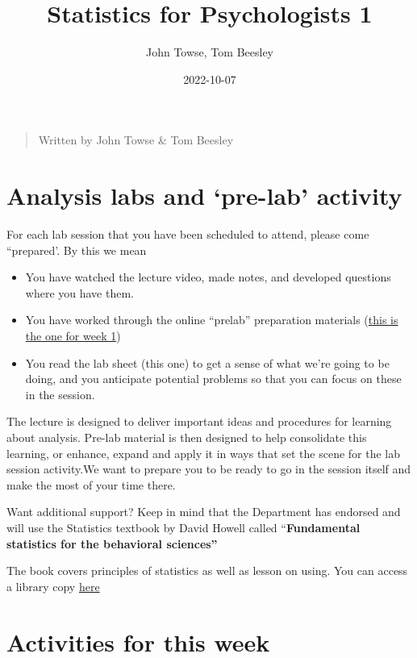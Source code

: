 \documentclass[
]{book}
\title{Statistics for Psychologists 1}
\author{John Towse, Tom Beesley}
\date{2022-10-07}
\begin{document}
\maketitle

{
\setcounter{tocdepth}{1}
\tableofcontents
}
\begin{quote}
Written by John Towse \& Tom Beesley
\end{quote}

\hypertarget{analysis-labs-and-pre-lab-activity}{%
\section{Analysis labs and `pre-lab' activity}\label{analysis-labs-and-pre-lab-activity}}

For each lab session that you have been scheduled to attend, please come ``prepared'. By this we mean

\begin{itemize}
\item
  You have watched the lecture video, made notes, and developed questions where you have them.
\item
  You have worked through the online ``prelab'' preparation materials (\href{https://ma-rconnect.lancs.ac.uk/Week_1_prep}{this is the one for week 1})
\item
  You read the lab sheet (this one) to get a sense of what we're going to be doing, and you anticipate potential problems so that you can focus on these in the session.
\end{itemize}

The lecture is designed to deliver important ideas and procedures for learning about analysis. Pre-lab material is then designed to help consolidate this learning, or enhance, expand and apply it in ways that set the scene for the lab session activity.We want to prepare you to be ready to go in the session itself and make the most of your time there.

Want additional support? Keep in mind that the Department has endorsed and will use the Statistics textbook by David Howell called ``\textbf{Fundamental statistics for the behavioral sciences''}

The book covers principles of statistics as well as lesson on using. You can access a library copy \href{https://onesearch.lancaster-university.uk/permalink/f/cssk39/44LAN_ALMA_DS51180136050001221}{here}\\

\hypertarget{activities-for-this-week}{%
\section{Activities for this week}\label{activities-for-this-week}}
\end{document}
